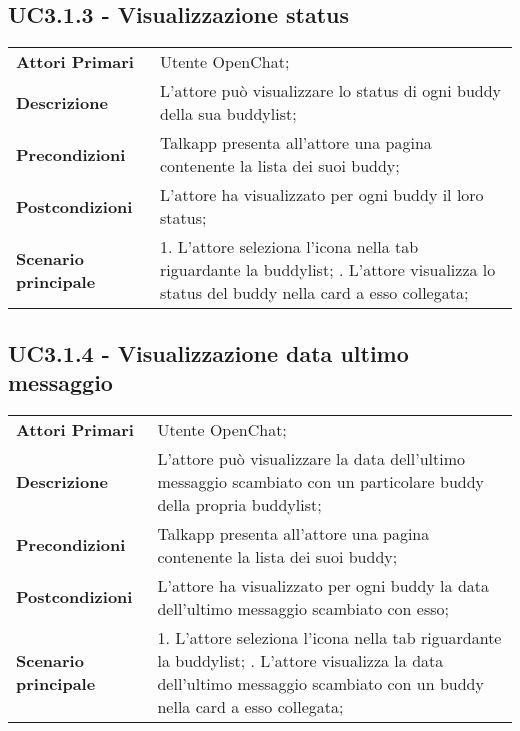 \subsection{UC3.1.3 - Visualizzazione status}
	\begin{center}
		\bgroup
		\def\arraystretch{1.8}     
		\begin{longtable}{  p{4cm} | p{9.5cm} } 
			\textbf{Attori Primari} & Utente OpenChat; \\ 
			\textbf{Descrizione} &  L'attore può visualizzare lo status di ogni buddy della sua buddylist; \\ 
			\textbf{Precondizioni}  & Talkapp presenta all'attore una pagina contenente la lista dei suoi buddy; \\
			\textbf{Postcondizioni} & L'attore ha visualizzato per ogni buddy  il loro status;  \\ 
			\textbf{Scenario principale} & 
			1. L'attore seleziona l'icona nella tab riguardante la buddylist; \newline
			2. L'attore visualizza lo status del buddy nella card a esso collegata;
		\end{longtable}
		\egroup
	\end{center}
\subsection{UC3.1.4 - Visualizzazione data ultimo messaggio}
	\begin{center}
		\bgroup
		\def\arraystretch{1.8}     
		\begin{longtable}{  p{4cm} | p{9.5cm} } 
			\textbf{Attori Primari} & Utente OpenChat; \\ 
			\textbf{Descrizione} &  L'attore può visualizzare la data dell'ultimo messaggio scambiato con un particolare buddy della propria buddylist; \\ 
			\textbf{Precondizioni}  & Talkapp presenta all'attore una pagina contenente la lista dei suoi buddy; \\
			\textbf{Postcondizioni} & L'attore ha visualizzato per ogni buddy  la data dell'ultimo messaggio scambiato con esso;  \\ 
			\textbf{Scenario principale} & 
			1. L'attore seleziona l'icona nella tab riguardante la buddylist; \newline
			2. L'attore visualizza la data dell'ultimo messaggio scambiato con un buddy nella card a esso collegata;
		\end{longtable}
		\egroup
	\end{center}
